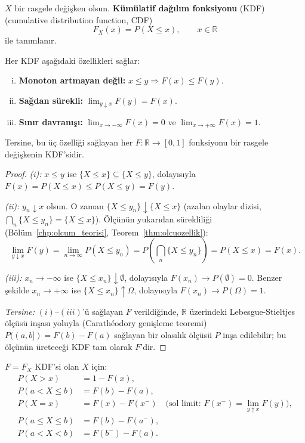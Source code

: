 \begin{tanim}
\label{def:kdf}
$X$ bir rasgele değişken olsun. \textbf{Kümülatif dağılım fonksiyonu} (KDF)
(cumulative distribution function, CDF)
\[
  F_X(x) = P(X \leq x), \qquad x \in \mathbb{R}
\]
ile tanımlanır.
\end{tanim}

\begin{teorem}
\label{thm:kdf_ozellik}
Her KDF aşağıdaki özellikleri sağlar:
\begin{enumerate}[(i)]
  \item \textbf{Monoton artmayan değil:} $x \leq y \Rightarrow F(x) \leq F(y)$.
  \item \textbf{Sağdan sürekli:} $\lim_{y \downarrow x} F(y) = F(x)$.
  \item \textbf{Sınır davranışı:} $\lim_{x \to -\infty} F(x) = 0$ ve
        $\lim_{x \to +\infty} F(x) = 1$.
\end{enumerate}
Tersine, bu üç özelliği sağlayan her $F : \mathbb{R} \to [0,1]$ fonksiyonu
bir rasgele değişkenin KDF'sidir.
\end{teorem}

\begin{proof}
\textit{(i):} $x \leq y$ ise $\{X \leq x\} \subseteq \{X \leq y\}$, dolayısıyla
$F(x) = P(X \leq x) \leq P(X \leq y) = F(y)$.

\textit{(ii):} $y_n \downarrow x$ olsun. O zaman $\{X \leq y_n\} \downarrow \{X \leq x\}$
(azalan olaylar dizisi, $\bigcap_n \{X \leq y_n\} = \{X \leq x\}$).
Ölçünün yukarıdan sürekliliği (Bölüm~\ref{chp:olcum_teorisi}, Teorem~\ref{thm:olcuozellik}):
\[
  \lim_{y \downarrow x} F(y) = \lim_{n \to \infty} P(X \leq y_n) = P\!\left(\bigcap_n \{X \leq y_n\}\right) = P(X \leq x) = F(x).
\]

\textit{(iii):} $x_n \to -\infty$ ise $\{X \leq x_n\} \downarrow \emptyset$, dolayısıyla
$F(x_n) \to P(\emptyset) = 0$. Benzer şekilde $x_n \to +\infty$ ise
$\{X \leq x_n\} \uparrow \Omega$, dolayısıyla $F(x_n) \to P(\Omega) = 1$.

\textit{Tersine:} $(i)$--$(iii)$'ü sağlayan $F$ verildiğinde,
$\mathbb{R}$ üzerindeki Lebesgue-Stieltjes ölçüsü inşası yoluyla
(Carathéodory genişleme teoremi) $P((a,b]) = F(b) - F(a)$ sağlayan
bir olasılık ölçüsü $P$ inşa edilebilir; bu ölçünün üreteceği KDF tam olarak $F$'dir.
\end{proof}

\begin{onerme}
\label{prop:kdf_hesap}
$F = F_X$ KDF'si olan $X$ için:
\begin{align*}
  P(X > x)   &= 1 - F(x), \\
  P(a < X \leq b) &= F(b) - F(a), \\
  P(X = x)   &= F(x) - F(x^-) \quad \text{(sol limit: } F(x^-) = \lim_{y \uparrow x} F(y)\text{)}, \\
  P(a \leq X \leq b) &= F(b) - F(a^-), \\
  P(a < X < b) &= F(b^-) - F(a).
\end{align*}
\end{onerme}


